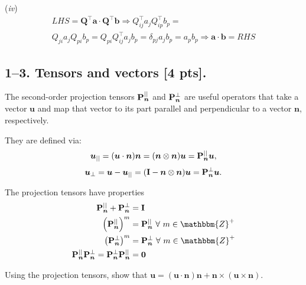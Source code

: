 \medskip
(\textit{iv})\begin{gather*}
    LHS = \bm{Q}^\intercal\bm{a} \cdot \bm{Q}^\intercal\bm{b} \Rightarrow Q_{ij}^\intercal a_j Q_{ip}^\intercal b_p=\\
    Q_{ji} a_j Q_{pi} b_p = Q_{pi}Q_{ij}^\intercal a_j b_p = \delta_{pj}a_j b_p= a_p b_p \Rightarrow \bm{a}\cdot\bm{b} = RHS
\end{gather*}

\subsection*{1--3. \textbf{Tensors and vectors} [4 pts].}
The second-order projection tensors $\mathbf{P}_{\bm{n}}^{||}$ and $\mathbf{P}_{\bm{n}}^{\perp}$ are useful operators that take a vector $\bm{u}$ and map that vector to its part parallel and perpendicular to a vector $\bm{n}$, respectively. 

They are defined via:
\begin{equation*}
    \bm{u}_{||} = (\bm{u} \cdot \bm{n}) \bm{n} = (\bm{n} \otimes \bm{n}) \bm{u} = \mathbf{P}_{\bm{n}}^{||} \bm{u},
\end{equation*}
\begin{equation*}
    \bm{u}_{\perp} = \bm{u} - \bm{u}_{||} = (\mathbf{I} - \bm{n} \otimes \bm{n}) \bm{u} = \mathbf{P}_{\bm{n}}^{\perp} \bm{u}.
\end{equation*}

The projection tensors have properties
\begin{align*}
    \bn{P}_{\bm{n}}^{||} + \bn{P}_{\bm{n}}^{\perp} &= \bn{I} \\
    \left(\bn{P}_{\bm{n}}^{||} \right)^m &= \bn{P}_{\bm{n}}^{||} ~\forall ~m \in \mathbbm{Z}^+\\
    \left(\bn{P}_{\bm{n}}^{\perp} \right)^m &= \bn{P}_{\bm{n}}^{\perp} ~\forall ~m \in \mathbbm{Z}^+\\
    \bn{P}_{\bm{n}}^{||} \bn{P}_{\bm{n}}^{\perp} = \bn{P}_{\bm{n}}^{\perp} \bn{P}_{\bm{n}}^{||}  &= \bn{0}
\end{align*}

Using the projection tensors, show that $\bm{u} = (\bm{u} \cdot \bm{n}) \bm{n} + \bm{n} \times (\bm{u} \times \bm{n} )$.

